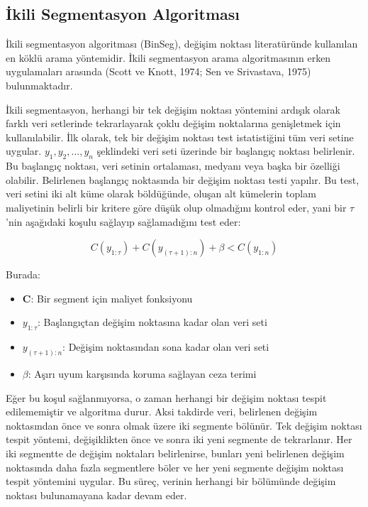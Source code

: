 \documentclass[12pt,twoside]{deuthesis}
\begin{document}
\subsection{İkili Segmentasyon Algoritması}\label{ikili-segmentasyon-algoritmasux131}

İkili segmentasyon algoritması (BinSeg), değişim noktası literatüründe kullanılan en köklü arama yöntemidir. İkili segmentasyon arama algoritmasının erken uygulamaları arasında (Scott ve Knott, 1974; Sen ve Srivastava, 1975) bulunmaktadır.

İkili segmentasyon, herhangi bir tek değişim noktası yöntemini ardışık olarak farklı veri setlerinde tekrarlayarak çoklu değişim noktalarına genişletmek için kullanılabilir. İlk olarak, tek bir değişim noktası test istatistiğini tüm veri setine uygular. \(y_{1},y_{2},...,y_{n}\) şeklindeki veri seti üzerinde bir başlangıç noktası belirlenir. Bu başlangıç noktası, veri setinin ortalaması, medyanı veya başka bir özelliği olabilir. Belirlenen başlangıç noktasında bir değişim noktası testi yapılır. Bu test, veri setini iki alt küme olarak böldüğünde, oluşan alt kümelerin toplam maliyetinin belirli bir kritere göre düşük olup olmadığını kontrol eder, yani bir \(\tau\)'nin aşağıdaki koşulu sağlayıp sağlamadığını test eder:

\[C(y_{1:\tau}) + C(y_{(\tau+1):n}) + \beta < C(y_{1:n})\]

Burada:

\begin{itemize}
\item \textbf{C}: Bir segment için maliyet fonksiyonu
\item \textbf{$y_{1:\tau}$}: Başlangıçtan değişim noktasına kadar olan veri seti
\item \textbf{$y_{(\tau+1):n}$}: Değişim noktasından sona kadar olan veri seti
\item \textbf{$\beta$}: Aşırı uyum karşısında koruma sağlayan ceza terimi
\end{itemize}

Eğer bu koşul sağlanmıyorsa, o zaman herhangi bir değişim noktası tespit edilememiştir ve algoritma durur. Aksi takdirde veri, belirlenen değişim noktasından önce ve sonra olmak üzere iki segmente bölünür. Tek değişim noktası tespit yöntemi, değişiklikten önce ve sonra iki yeni segmente de tekrarlanır. Her iki segmentte de değişim noktaları belirlenirse, bunları yeni belirlenen değişim noktasında daha fazla segmentlere böler ve her yeni segmente değişim noktası tespit yöntemini uygular. Bu süreç, verinin herhangi bir bölümünde değişim noktası bulunamayana kadar devam eder.
\end{document}
